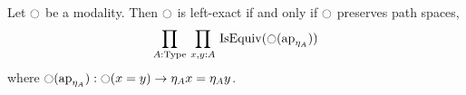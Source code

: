 \begin{prop}\label{prop:lex}
  Let $\ocircle$ be a modality. Then $\ocircle$ is left-exact if and only
  if
  $\ocircle$ preserves path spaces, \ie{}
    \[
      \prod_{A:\operatorname{Type}}\, \prod_{x,y:A}\, \operatorname{IsEquiv} (\ocircle (\mathrm{ap}_{\eta_A}))
    \]
    where $\ocircle (\mathrm{ap}_{\eta_A}) : \ocircle(x = y) \to \eta_A x = \eta_A
    y$.
\end{prop}
